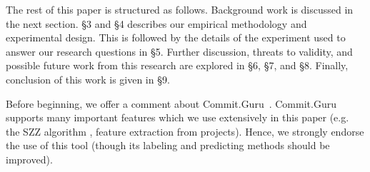 \documentclass[10pt,journal,compsoc]{IEEEtran}
\newcommand{\ei}{\end{itemize}}
\begin{document}
The rest of this paper is structured as follows. Background work is discussed  in the next section.
\S3 and \S4 describes our empirical methodology and experimental design.  This is followed by the details of the experiment used
to answer our research questions in \S5.
Further discussion, threats to validity, and  possible
future work from this research are explored in \S6, \S7, and \S8. Finally, conclusion of this work is given in \S9.
  
  Before beginning, we offer a comment about Commit.Guru~\cite{commitguru}. 
 Commit.Guru supports
  many  important features which we use extensively in this paper (e.g. the SZZ algorithm \cite{Kim08changes, Sliwerski05changes, costa17szz}, feature extraction from projects). 
  Hence, we strongly endorse the use of this tool (though its
   labeling and predicting methods should be improved).
  

 
  
  

  
  




\end{document}
